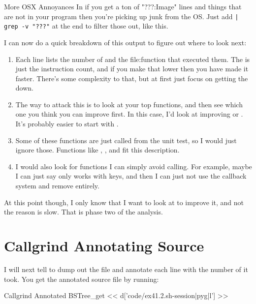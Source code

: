 \begin{aside}{More OSX Annoyances}
In if you get a ton of "???:Image" lines and things that are not in your
program then you're picking up junk from the OS.  Just add \verb,| grep -v "???",
at the end to filter those out, like this.
\end{aside}

I can now do a quick breakdown of this output to figure out where to look
next:

\begin{enumerate}
\item Each line lists the number of  and the file:function that
    executed them.  The  is just the instruction count, and if you
    make that lower then you have made it faster.  There's some complexity
    to that, but at first just focus on getting the  down.
\item The way to attack this is to look at your top functions, and then 
    see which one you think you can improve first.  In this case, I'd look
    at improving  or .  It's probably
    easier to start with .
\item Some of these functions are just called from the unit test, so I would
    just ignore those.  Functions like , ,
    and  fit this description.
\item I would also look for functions I can simply avoid calling.  For example,
    maybe I can just say  only works with  keys,
    and then I can just not use the callback system and remove  
    entirely.
\end{enumerate}

At this point though, I only know that I want to look at 
to improve it, and not the reason  is slow.  That is
phase two of the analysis.

\section{Callgrind Annotating Source}

I will next tell  to dump out the 
file and annotate each line with the number of  it took.  You
get the annotated source file by running:

\begin{code}{Callgrind Annotated BSTree\_get}
<< d['code/ex41.2.sh-session|pyg|l'] >>
\end{code}

